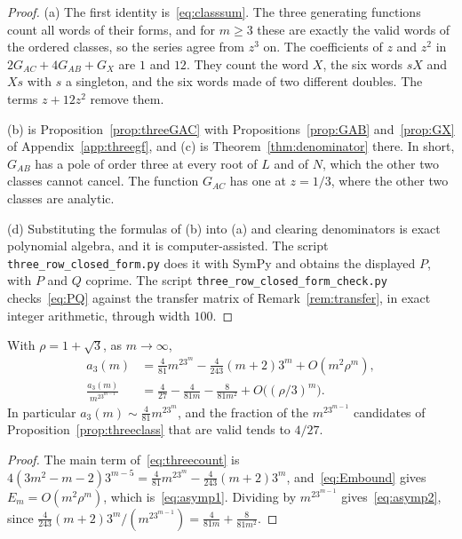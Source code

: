 \begin{proof}
(a) The first identity is~\eqref{eq:classsum}. The three generating functions count all words
of their forms, and for $m\ge3$ these are exactly the valid words of the ordered classes, so
the series agree from $z^3$ on. The coefficients of $z$ and $z^2$ in $2G_{AC}+4G_{AB}+G_X$ are
$1$ and $12$. They count the word $X$, the six words $sX$ and $Xs$ with $s$ a singleton, and
the six words made of two different doubles. The terms $z+12z^2$ remove them.

(b) is Proposition~\ref{prop:threeGAC} with Propositions~\ref{prop:GAB} and~\ref{prop:GX} of
Appendix~\ref{app:threegf}, and (c) is Theorem~\ref{thm:denominator} there. In short,
$G_{AB}$ has a pole of order three at every root of $L$ and of $N$, which the other two
classes cannot cancel. The function $G_{AC}$ has one at $z=1/3$, where the other two classes
are analytic.

(d) Substituting the formulas of (b) into (a) and clearing denominators is exact polynomial
algebra, and it is computer-assisted. The script \texttt{three\_row\_closed\_form.py} does it
with SymPy and obtains the displayed $P$, with $P$ and $Q$ coprime. The script
\texttt{three\_row\_closed\_form\_check.py} checks~\eqref{eq:PQ} against the transfer matrix of
Remark~\ref{rem:transfer}, in exact integer arithmetic, through width $100$.
\end{proof}

\begin{corollary}[asymptotics]\label{cor:threeasymp}
With $\rho=1+\sqrt3$, as $m\to\infty$,
\begin{align}
a_3(m)&=\frac4{81}m^23^m-\frac4{243}(m+2)3^m+O(m^2\rho^m),\label{eq:asymp1}\\
\frac{a_3(m)}{m^23^{m-1}}&=\frac4{27}-\frac4{81m}-\frac8{81m^2}+O\bigl((\rho/3)^m\bigr).
\label{eq:asymp2}
\end{align}
In particular $a_3(m)\sim\frac4{81}m^23^m$, and the fraction of the $m^23^{m-1}$ candidates of
Proposition~\ref{prop:threeclass} that are valid tends to $4/27$.
\end{corollary}

\begin{proof}
The main term of~\eqref{eq:threecount} is
$4(3m^2-m-2)3^{m-5}=\frac4{81}m^23^m-\frac4{243}(m+2)3^m$, and~\eqref{eq:Embound} gives
$E_m=O(m^2\rho^m)$, which is~\eqref{eq:asymp1}. Dividing by $m^23^{m-1}$
gives~\eqref{eq:asymp2}, since $\frac4{243}(m+2)3^m/(m^23^{m-1})=\frac4{81m}+\frac8{81m^2}$.
\end{proof}

